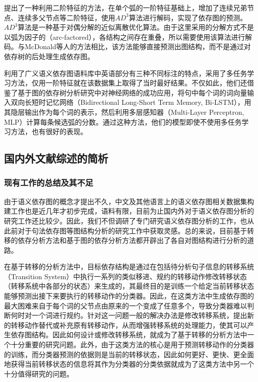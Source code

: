 提出了一种利用二阶特征的方法，在单个弧的一阶特征基础上，增加了连续兄弟节点、连续多父节点等二阶特征，使用$AD^3$算法\cite{martins2014ad3}进行解码，实现了依存图的预测。$AD^3$算法是一种基于对偶分解的近似离散优化算法。由于这里采用的分解方式不是以弧为因子的（arc-factored），各结构之间存在重叠，所以需要使用该算法进行解码。与McDonald等人的方法相比，该方法能够直接预测出图结构，而不是通过对依存树的后处理生成依存图。

利用了广义语义依存图语料库中英语部分有三种不同标注的特点，采用了多任务学习方法，仅用一阶特征就在该数据集上取得了当时最好结果。不仅如此，他们还借鉴了基于图的依存树分析研究中对神经网络的成功应用\cite{TACL885}，将句中每个词的词向量输入双向长短时记忆网络（Bidirectional Long-Short Term Memory, Bi-LSTM），用其隐层输出作为每个词的表示，然后利用多层感知器（Multi-Layer Perceptron, MLP）计算每条候选弧的分数。通过这种方法，他们的模型即使不使用多任务学习方法，也有很好的表现。


\subsection{国内外文献综述的简析}
\subsubsection{现有工作的总结及其不足}
\label{drawback}

由于语义依存图的概念才提出不久，中文及其他语言上的语义依存图相关数据集构建工作也是近几年才初步完成，语料有限，目前为止国内外对于语义依存图分析的研究工作还比较少。因此，我们不但调研了专门研究语义依存图分析的工作，也从此前对于句法依存图等图结构分析的研究工作中获取灵感。总的来说，目前基于转移的依存分析方法和基于图的依存分析方法都开辟出了各自对图结构进行分析的道路。

在基于转移的分析方法中，目标依存结构是通过在包括待分析句子信息的转移系统（Transition System）中执行一系列的类似移进、规约的转移动作修改转移状态（转移系统中各部分的状态）来生成的，其最终目的是训练一个给定当前转移状态能够预测出接下来要执行的转移动作的分类器。因此，在这类方法中生成依存图的最大困难来自于每个词的父节点由原来的一个变成了任意多个，导致分类器难以判断何时对一个词进行规约。针对这一问题一般的解决办法是修改转移系统，提出新的转移动作替代或补充原有转移动作，从而增强转移系统的处理能力，使其可以产生依存图结构。因此如何设计或修改转移系统，就成为了基于转移的分析方法中一个十分重要的研究问题。此外，由于这类方法的核心是用于预测转移动作的分类器的训练，而分类器预测的依据则是当前的转移状态，因此如何更好、更快、更全面地获得当前转移状态的信息将其作为分类器的分类依据就成为了这类方法中另一个十分值得研究的问题。


